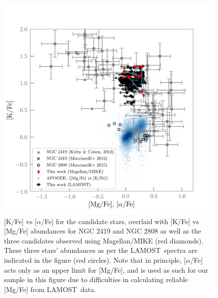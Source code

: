 \documentclass[a4paper,fleqn,usenatbib]{mnras}
\newcommand{\project}[1]{#1}
\newcommand{\lamost}{\project{LAMOST}}
\begin{document}
\begin{figure}
	\includegraphics[width=\columnwidth]{KvsMg.png}
    \caption{[K/Fe] vs [$\alpha$/Fe] for the candidate stars, overlaid with [K/Fe] vs [Mg/Fe] abundances for NGC 2419 and NGC 2808 \citep{cohenkirby2012, mucciarelli2012, mucciarelli2015} as well as the three candidates observed using Magellan/MIKE (red diamonds). These three stars' abundances as per the \lamost\ spectra are indicated in the figure (red circles). Note that in principle, [$\alpha$/Fe] acts only as an upper limit for [Mg/Fe], and is used as such for our sample in this figure due to difficulties in calculating reliable [Mg/Fe] from \lamost\ data.}
    \label{KvsMg}
\end{figure}
\end{document}
